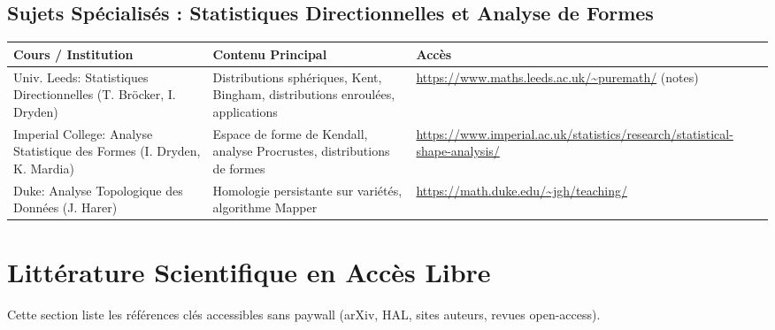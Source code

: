 \documentclass[11pt,a4paper]{article}
\begin{document}
\subsection{Sujets Spécialisés : Statistiques Directionnelles et Analyse de Formes}
\begin{longtable}{@{}p{3.2cm}p{5.5cm}p{5.3cm}@{}}
\toprule
\textbf{Cours / Institution} & \textbf{Contenu Principal} & \textbf{Accès} \\
\midrule
Univ. Leeds: Statistiques Directionnelles (T. Bröcker, I. Dryden) & Distributions sphériques, Kent, Bingham, distributions enroulées, applications & \url{https://www.maths.leeds.ac.uk/~puremath/} (notes) \\
Imperial College: Analyse Statistique des Formes (I. Dryden, K. Mardia) & Espace de forme de Kendall, analyse Procrustes, distributions de formes & \url{https://www.imperial.ac.uk/statistics/research/statistical-shape-analysis/} \\
Duke: Analyse Topologique des Données (J. Harer) & Homologie persistante sur variétés, algorithme Mapper & \url{https://math.duke.edu/~jgh/teaching/} \\
\bottomrule
\end{longtable}

\section{Littérature Scientifique en Accès Libre}

Cette section liste les références clés accessibles sans paywall (arXiv, HAL, sites auteurs, revues open-access).
\end{document}
